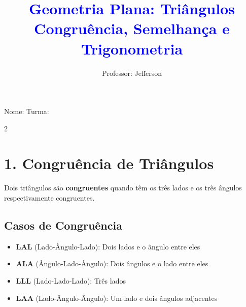 \documentclass[11pt]{article}
\title{\textcolor{blue}{Geometria Plana: Triângulos \\ Congruência, Semelhança e Trigonometria}}
\author{Professor: Jefferson}
\date{}
\begin{document}
\maketitle
\vspace{-1cm}

\begin{center}
    \large{Nome: \underline{\hspace{8cm}} \quad Turma: \underline{\hspace{3cm}}}
\end{center}

\begin{multicols}{2}

\section*{1. Congruência de Triângulos}

Dois triângulos são \textbf{congruentes} quando têm os três lados e os três ângulos respectivamente congruentes.

\subsection*{Casos de Congruência}
\begin{itemize}
    \item \textbf{LAL} (Lado-Ângulo-Lado): Dois lados e o ângulo entre eles
    \item \textbf{ALA} (Ângulo-Lado-Ângulo): Dois ângulos e o lado entre eles
    \item \textbf{LLL} (Lado-Lado-Lado): Três lados
    \item \textbf{LAA} (Lado-Ângulo-Ângulo): Um lado e dois ângulos adjacentes
\end{itemize}

\begin{center}
\end{center}
\end{multicols}
\end{document}
